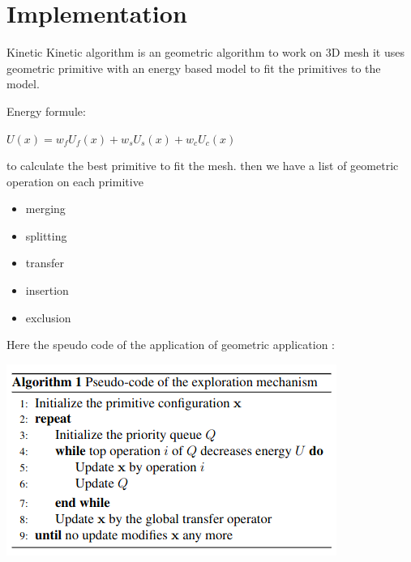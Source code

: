 \documentclass[10pt]{beamer}
\begin{document}
\section{Implementation}
\begin{frame}{Kinetic}
Kinetic algorithm is an geometric algorithm to work on 3D mesh it uses  geometric primitive with an energy based model to fit the primitives to the model.

Energy formule: 
\newline
\begin{center}
    $        U(x) = w_f U_f(x) + w_s U_s(x) + w_c U_c(x)       $
\end{center}

to calculate the best primitive to fit the mesh.
then we have a list of geometric operation on each primitive
\begin{itemize}
    \item merging
    \item splitting 
    \item transfer 
    \item insertion
    \item exclusion
\end{itemize}
\end{frame}
\begin{frame}
    
    Here the speudo code of the application of geometric application : 
    
    \begin{center}
        \includegraphics[scale =  0.5]{../../images/Pseudo_code_exploration.png}
      \end{center} 
\end{frame}
\end{document}
